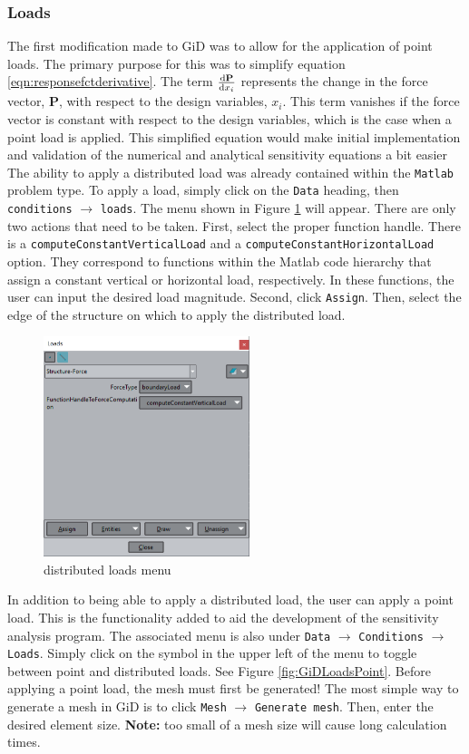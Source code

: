 \subsubsection{Loads}
The first modification made to GiD was to allow for the application of point loads. The primary purpose for this was to simplify equation \ref{eqn:responsefctderivative}. The term $\dv{\textbf{P}}{x_i}$ represents the change in the force vector, $\textbf{P}$, with respect to the design variables, $x_i$. This term vanishes if the force vector is constant with respect to the design variables, which is the case when a point load is applied. This simplified equation would make initial implementation and validation of the numerical and analytical sensitivity equations a bit easier\\[6pt]
The ability to apply a distributed load was already contained within the \texttt{Matlab} problem type. To apply a load, simply click on the \texttt{Data} heading, then \texttt{conditions} $\rightarrow$ \texttt{loads}. The menu shown in Figure \ref{fig:GiDLoadsDist} will appear. There are only two actions that need to be taken. First, select the proper function handle. There is a \texttt{computeConstantVerticalLoad} and a \texttt{computeConstantHorizontalLoad} option. They correspond to functions within the Matlab code hierarchy that assign a constant vertical or horizontal load, respectively. In these functions, the user can input the desired load magnitude. Second, click \texttt{Assign}. Then, select the edge of the structure on which to apply the distributed load.

\begin{figure}[ht]
  \centering
  \includegraphics[width=60mm]{images/GiD_loads_dist.png}
  \caption{distributed loads menu}
  \label{fig:GiDLoadsDist}
\end{figure}

In addition to being able to apply a distributed load, the user can apply a point load. This is the functionality added to aid the development of the sensitivity analysis program. The associated menu is also under \texttt{Data} $\rightarrow$ \texttt{Conditions} $\rightarrow$ \texttt{Loads}. Simply click on the symbol in the upper left of the menu to toggle between point and distributed loads. See Figure \ref{fig:GiDLoadsPoint}. Before applying a point load, the mesh must first be generated! The most simple way to generate a mesh in GiD is to click \texttt{Mesh} $\rightarrow$ \texttt{Generate mesh}. Then, enter the desired element size. \textbf{Note:} too small of a mesh size will cause long calculation times.

